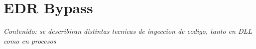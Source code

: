 \chapter{EDR Bypass}

\textit{Contenido: se describiran distintas tecnicas de inyeccion de codigo,
tanto en DLL como en procesos}
\vspace{1em}



